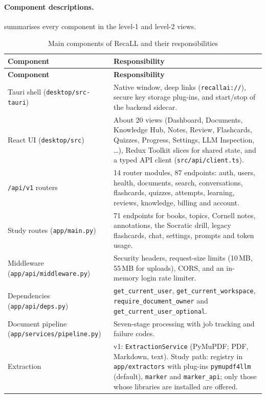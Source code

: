 \paragraph{Component descriptions.}
 summarises every component in the level-1 and level-2 views.

{\small
\begin{longtable}{@{}p{}p{}@{}}
\caption{Main components of RecaLL and their responsibilities}\label{tab:components}\\
\toprule
\textbf{Component} & \textbf{Responsibility}\\
\midrule
\endfirsthead
\toprule
\textbf{Component} & \textbf{Responsibility}\\
\midrule
\endhead
\bottomrule
\endfoot
Tauri shell (\texttt{desktop/src-tauri}) & Native window, deep links (\texttt{recallai://}), secure key storage plug-ins, and start/stop of the backend sidecar.\\
React UI (\texttt{desktop/src}) & About 20 views (Dashboard, Documents, Knowledge Hub, Notes, Review, Flashcards, Quizzes, Progress, Settings, LLM Inspection, \ldots), Redux Toolkit slices for shared state, and a typed API client (\texttt{src/api/client.ts}).\\
\texttt{/api/v1} routers & 14 router modules, 87 endpoints: auth, users, health, documents, search, conversations, flashcards, quizzes, attempts, learning, reviews, knowledge, billing and account.\\
Study routes (\texttt{app/main.py}) & 71 endpoints for books, topics, Cornell notes, annotations, the Socratic drill, legacy flashcards, chat, settings, prompts and token usage.\\
Middleware (\texttt{app/api/middleware.py}) & Security headers, request-size limits (10\,MB, 55\,MB for uploads), CORS, and an in-memory login rate limiter.\\
Dependencies (\texttt{app/api/deps.py}) & \texttt{get\_current\_user}, \texttt{get\_current\_workspace}, \texttt{require\_document\_owner} and \texttt{get\_current\_user\_optional}.\\
Document pipeline (\texttt{app/services/\allowbreak{}pipeline.py}) & Seven-stage processing with job tracking and failure codes.\\
Extraction & v1: \texttt{ExtractionService} (PyMuPDF; PDF, Markdown, text). Study path: registry in \texttt{app/extractors} with plug-ins \texttt{pymupdf4llm} (default), \texttt{marker} and \texttt{marker\_api}; only those whose libraries are installed are offered.\\

\end{longtable}}
